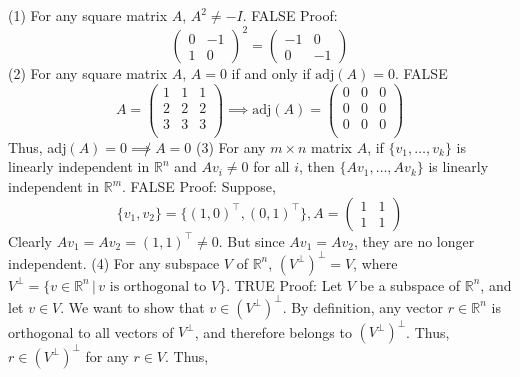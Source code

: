 \documentclass{article}
\begin{document}
(1) For any square matrix \(A\), \(A^2 \neq -I\). FALSE
\newline
Proof: 
$$\left(\begin{array}{cc}
      0 & -1 \\
      1 & 0
    \end{array}\right)^2 = 
    \left(\begin{array}{cc}
      -1 & 0 \\
      0 & -1
    \end{array}\right)$$
\newline
(2) For any square matrix \(A\), \(A = 0\) if and only if \(\text{adj}(A) = 0\). FALSE
\newline
$$A = \left(\begin{array}{ccc}
      1 & 1 & 1\\
      2 & 2 & 2 \\
      3 & 3 & 3 \\
    \end{array}\right) \implies \text{adj}(A) = 
    \left(\begin{array}{ccc}
      0 & 0 & 0\\
      0 & 0 & 0\\
      0 & 0 & 0\\
    \end{array}\right)$$
Thus, adj$(A) = 0 \not\implies A = 0$ 
\newline
\newline
(3) For any \(m \times n\) matrix \(A\), if \(\{v_1, \ldots, v_k\}\) is linearly independent in \(\mathbb{R}^n\) and \(A v_i \neq 0\) for all \(i\), then \(\{A v_1, \ldots , A v_k\}\) is linearly independent in \(\mathbb{R}^m\). FALSE
\newline
Proof: Suppose,
$$\{v_1, v_2\} = \{(1, 0)^\top, (0, 1)^\top\}, A = 
\left(\begin{array}{cc}
      1 & 1\\
      1 & 1
    \end{array}\right)$$
Clearly $Av_1 = Av_2 = (1, 1)^\top \neq 0$. But since $Av_1 = Av_2$, they are no longer independent.
\newline
\newline
(4) For any subspace \(V\) of \(\mathbb{R}^n\), \((V^\perp)^\perp = V\), where \(V^\perp = \{v \in \mathbb{R}^n \,|\, v \text{ is orthogonal to } V\}\). TRUE
\newline
Proof: Let \(V\) be a subspace of \(\mathbb{R}^n\), and let \(v \in V\). We want to show that \(v \in (V^\perp)^\perp\).
By definition, any vector \(r \in \mathbb{R}^n\) is orthogonal to all vectors of \(V^\perp\), and therefore belongs to \((V^\perp)^\perp\). Thus, \(r \in (V^\perp)^\perp\) for any \(r \in V\). Thus,
\end{document}
